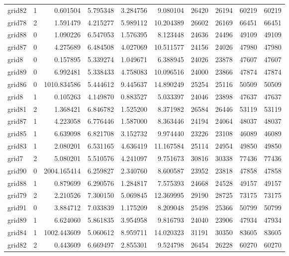 \begin{longtable}{|l|r|r|r|r|r|r|r|r|r|}
grid82 & 1 & 0.601504 & 5.795348 & 3.284756 & 9.080104 & 26420 & 26194 & 60219 & 60219 \\
grid78 & 2 & 1.591479 & 4.215277 & 5.989112 & 10.204389 & 26602 & 26169 & 66451 & 66451 \\
grid88 & 0 & 1.090226 & 6.547053 & 1.576395 & 8.123448 & 24636 & 24496 & 49109 & 49109 \\
grid87 & 0 & 4.275689 & 6.484508 & 4.027069 & 10.511577 & 24156 & 24026 & 47980 & 47980 \\
grid8 & 0 & 0.157895 & 5.339274 & 1.049671 & 6.388945 & 24026 & 23878 & 47607 & 47607 \\
grid89 & 0 & 6.992481 & 5.338433 & 4.758083 & 10.096516 & 24000 & 23866 & 47874 & 47874 \\
grid86 & 0 & 1010.834586 & 5.444612 & 9.445637 & 14.890249 & 25254 & 25116 & 50509 & 50509 \\
grid8 & 1 & 0.105263 & 4.149870 & 0.883527 & 5.033397 & 24046 & 23898 & 47637 & 47637 \\
grid81 & 2 & 1.368421 & 6.846782 & 1.525200 & 8.371982 & 26584 & 26446 & 53119 & 53119 \\
grid87 & 1 & 4.223058 & 6.776446 & 1.587000 & 8.363446 & 24194 & 24064 & 48037 & 48037 \\
grid85 & 1 & 6.639098 & 6.821708 & 3.152732 & 9.974440 & 23226 & 23108 & 46089 & 46089 \\
grid83 & 1 & 2.080201 & 6.531165 & 4.636419 & 11.167584 & 25114 & 24954 & 49850 & 49850 \\
grid7 & 2 & 5.080201 & 5.510576 & 4.241097 & 9.751673 & 30816 & 30338 & 77436 & 77436 \\
grid90 & 0 & 2004.165414 & 6.259827 & 2.340760 & 8.600587 & 23952 & 23818 & 47858 & 47858 \\
grid88 & 1 & 0.879699 & 6.290576 & 1.284817 & 7.575393 & 24668 & 24528 & 49157 & 49157 \\
grid79 & 2 & 2.210526 & 7.300150 & 5.069845 & 12.369995 & 29190 & 28725 & 73175 & 73175 \\
grid91 & 0 & 3.884712 & 7.033839 & 1.175209 & 8.209048 & 25498 & 25366 & 50799 & 50799 \\
grid89 & 1 & 6.624060 & 5.861835 & 3.954958 & 9.816793 & 24040 & 23906 & 47934 & 47934 \\
grid84 & 1 & 1002.443609 & 5.060612 & 8.959711 & 14.020323 & 31191 & 30350 & 83605 & 83605 \\
grid82 & 2 & 0.443609 & 6.669497 & 2.855301 & 9.524798 & 26454 & 26228 & 60270 & 60270 \\

\end{longtable}

